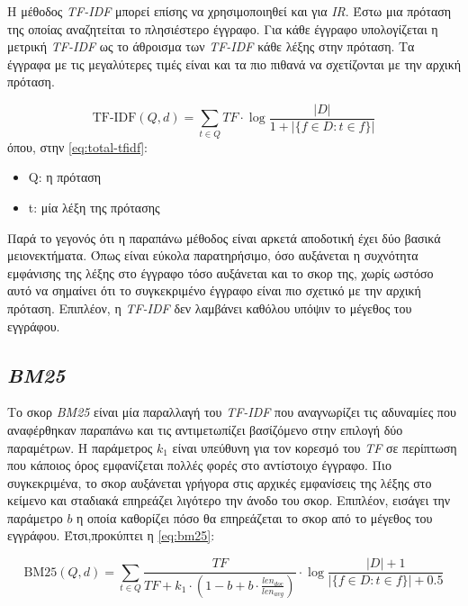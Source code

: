 Η μέθοδος \emph{TF-IDF} μπορεί επίσης να χρησιμοποιηθεί και για \emph{IR}. Έστω μια πρόταση της οποίας αναζητείται το πλησιέστερο έγγραφο. Για κάθε έγγραφο υπολογίζεται η μετρική \emph{TF-IDF} ως το άθροισμα των \emph{TF-IDF} κάθε λέξης στην πρόταση. Τα έγγραφα με τις μεγαλύτερες τιμές είναι και τα πιο πιθανά να σχετίζονται με την αρχική πρόταση.

\begin{equation}
    \label{eq:total-tfidf}
    \text{TF-IDF}(Q,d) = \sum_{t \in Q} TF \cdot \log {\frac{ |D| }{ 1 + | \{ f \in D : t \in f \} |}}
\end{equation}
όπου, στην \autoref{eq:total-tfidf}:
\begin{itemize}
    \item Q: η πρόταση
    \item t: μία λέξη της πρότασης
\end{itemize}

Παρά το γεγονός ότι η παραπάνω μέθοδος είναι αρκετά αποδοτική έχει δύο βασικά μειονεκτήματα. Όπως είναι εύκολα παρατηρήσιμο, όσο αυξάνεται η συχνότητα εμφάνισης της λέξης στο έγγραφο τόσο αυξάνεται και το σκορ της, χωρίς ωστόσο αυτό να σημαίνει ότι το συγκεκριμένο έγγραφο είναι πιο σχετικό με την αρχική πρόταση. Επιπλέον, η \emph{TF-IDF} δεν λαμβάνει καθόλου υπόψιν το μέγεθος του εγγράφου.

\subsection{\emph{BM25}}
Το σκορ \emph{BM25} είναι μία παραλλαγή του \emph{TF-IDF} που αναγνωρίζει τις αδυναμίες που αναφέρθηκαν παραπάνω και τις αντιμετωπίζει βασίζόμενο στην επιλογή δύο παραμέτρων. Η παράμετρος $k_1$ είναι υπεύθυνη για τον κορεσμό του \emph{TF} σε περίπτωση που κάποιος όρος εμφανίζεται πολλές φορές στο αντίστοιχο έγγραφο. Πιο συγκεκριμένα, το σκορ αυξάνεται γρήγορα στις αρχικές εμφανίσεις της λέξης στο κείμενο και σταδιακά επηρεάζει λιγότερο την άνοδο του σκορ. Επιπλέον, εισάγει την παράμετρο $b$ η οποία καθορίζει πόσο θα επηρεάζεται το σκορ από το μέγεθος του εγγράφου. Έτσι,προκύπτει η \autoref{eq:bm25}:

\begin{equation}
    \label{eq:bm25}
    \text{BM25}(Q,d) = \sum_{t \in Q} \frac{TF}{TF + k_1 \cdot (1 - b + b \cdot \frac{len_{doc}}{len_{avg}})} \cdot \log {\frac{|D| + 1}{| \{ f \in D : t \in f \} | + 0.5}}
\end{equation}


